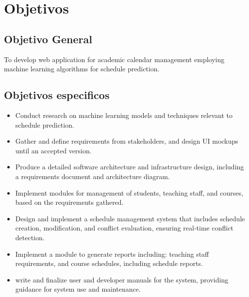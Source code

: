 \section{Objetivos}


\subsection{Objetivo General}

To develop web application for academic calendar management employing machine learning algorithms for schedule prediction.

\subsection{Objetivos especificos}

\begin{itemize}
    \item Conduct research on machine learning models and techniques relevant to schedule prediction.
    \item Gather and define requirements from stakeholders, and design UI mockups until an accepted version. 
    \item Produce a detailed software architecture and infrastructure design, including a requirements document and architecture diagram.
    \item Implement modules for management of students, teaching staff, and courses, based on the requirements gathered.
    \item Design and implement a schedule management system that includes schedule creation, modification, and conflict evaluation, ensuring real-time conflict detection.
    \item Implement a module to generate reports including: teaching staff requirements, and course schedules, including schedule reports.
    \item write and finalize user and developer manuals for the system, providing guidance for system use and maintenance.
\end{itemize}




